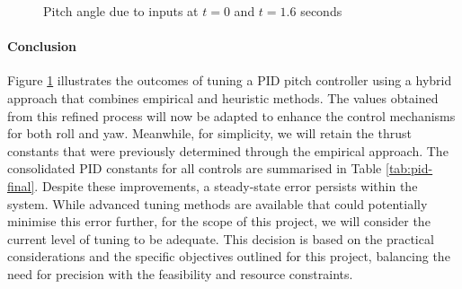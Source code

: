 \documentclass[12pt]{article}
\begin{document}
\begin{figure}[ht]
    \centering
    \caption{Pitch angle due to inputs at $t = 0$ and $t = 1.6$ seconds}
    \label{fig:combined-znemp}
\end{figure}


\paragraph{Conclusion}
Figure \ref{fig:combined-znemp} illustrates the outcomes of tuning a PID pitch controller using a hybrid approach that combines empirical and heuristic methods. The values obtained from this refined process will now be adapted to enhance the control mechanisms for both roll and yaw. Meanwhile, for simplicity, we will retain the thrust constants that were previously determined through the empirical approach. The consolidated PID constants for all controls are summarised in Table \ref{tab:pid-final}. Despite these improvements, a steady-state error persists within the system. While advanced tuning methods are available that could potentially minimise this error further, for the scope of this project, we will consider the current level of tuning to be adequate. This decision is based on the practical considerations and the specific objectives outlined for this project, balancing the need for precision with the feasibility and resource constraints.
\end{document}
